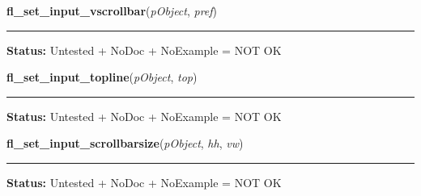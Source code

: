     \label{xformslib:library:fl_set_input_vscrollbar}

    \vspace{0.5ex}

\hspace{.8\funcindent}\begin{boxedminipage}{\funcwidth}

    \raggedright \textbf{fl\_set\_input\_vscrollbar}(\textit{pObject}, \textit{pref})

    \vspace{-1.5ex}

    \rule{\textwidth}{0.5\fboxrule}
\setlength{\parskip}{2ex}
\setlength{\parskip}{1ex}
\textbf{Status:} Untested + NoDoc + NoExample = NOT OK



    \end{boxedminipage}

    \label{xformslib:library:fl_set_input_topline}

    \vspace{0.5ex}

\hspace{.8\funcindent}\begin{boxedminipage}{\funcwidth}

    \raggedright \textbf{fl\_set\_input\_topline}(\textit{pObject}, \textit{top})

    \vspace{-1.5ex}

    \rule{\textwidth}{0.5\fboxrule}
\setlength{\parskip}{2ex}
\setlength{\parskip}{1ex}
\textbf{Status:} Untested + NoDoc + NoExample = NOT OK



    \end{boxedminipage}

    \label{xformslib:library:fl_set_input_scrollbarsize}

    \vspace{0.5ex}

\hspace{.8\funcindent}\begin{boxedminipage}{\funcwidth}

    \raggedright \textbf{fl\_set\_input\_scrollbarsize}(\textit{pObject}, \textit{hh}, \textit{vw})

    \vspace{-1.5ex}

    \rule{\textwidth}{0.5\fboxrule}
\setlength{\parskip}{2ex}
\setlength{\parskip}{1ex}
\textbf{Status:} Untested + NoDoc + NoExample = NOT OK



    \end{boxedminipage}

